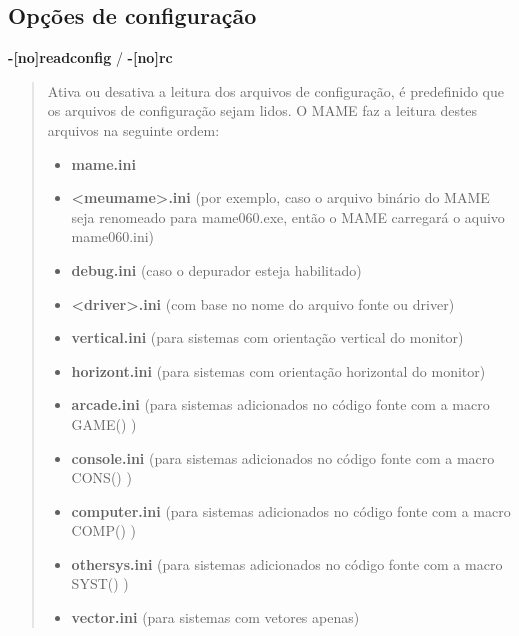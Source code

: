 \documentclass[letterpaper,10pt,brazil]{sphinxmanual}
\begin{document}
\subsection{Opções de configuração}
\label{commandline/commandline-all:opcoes-de-configuracao}\label{commandline/commandline-all:mame-commandline-noreadconfig}
\textbf{-{[}no{]}readconfig} / \textbf{-{[}no{]}rc}
\begin{quote}

Ativa ou desativa a leitura dos arquivos de configuração,
é predefinido que os arquivos de configuração sejam lidos.
O MAME faz a leitura destes arquivos na seguinte ordem:
\begin{itemize}
\item {} 
\textbf{mame.ini}

\item {} 
\textbf{\textless{}meumame\textgreater{}.ini}   (por exemplo, caso o arquivo binário do MAME seja renomeado para mame060.exe, então o MAME carregará o aquivo mame060.ini)

\item {} 
\textbf{debug.ini}       (caso o depurador esteja habilitado)

\item {} 
\textbf{\textless{}driver\textgreater{}.ini}    (com base no nome do arquivo fonte ou driver)

\item {} 
\textbf{vertical.ini}    (para sistemas com orientação vertical do monitor)

\item {} 
\textbf{horizont.ini}    (para sistemas com orientação horizontal do monitor)

\item {} 
\textbf{arcade.ini}      (para sistemas adicionados no código fonte com a macro  GAME() )

\item {} 
\textbf{console.ini}     (para sistemas adicionados no código fonte com a macro CONS() )

\item {} 
\textbf{computer.ini}    (para sistemas adicionados no código fonte com a macro COMP() )

\item {} 
\textbf{othersys.ini}    (para sistemas adicionados no código fonte com a macro SYST() )

\item {} 
\textbf{vector.ini}      (para sistemas com vetores apenas)


\end{itemize}
\end{quote}
\end{document}
